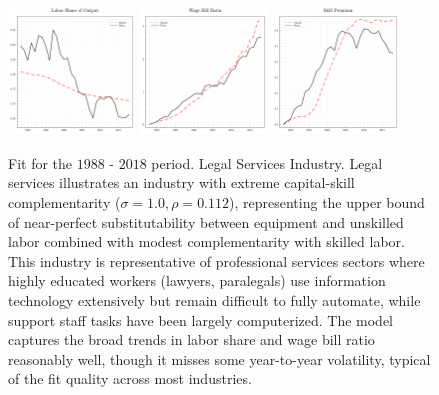 \documentclass[12pt]{article}
\begin{document}
\begin{figure}[H]
 \centering
 \includegraphics[width=0.3\textwidth]{../images/fig_ind_5411_estimation_ls_doc.pdf}
 \hfill
 \includegraphics[width=0.3\textwidth]{../images/fig_ind_5411_estimation_wbr_doc.pdf}
 \hfill
 \includegraphics[width=0.3\textwidth]{../images/fig_ind_5411_estimation_sp_doc.pdf}
 \caption{\label{fig:estimation_5411} Fit for the $1988$ - $2018$ period. Legal Services Industry. Legal services illustrates an industry with extreme capital-skill complementarity ($\sigma = 1.0, \rho = 0.112$), representing the upper bound of near-perfect substitutability between equipment and unskilled labor combined with modest complementarity with skilled labor. This industry is representative of professional services sectors where highly educated workers (lawyers, paralegals) use information technology extensively but remain difficult to fully automate, while support staff tasks have been largely computerized. The model captures the broad trends in labor share and wage bill ratio reasonably well, though it misses some year-to-year volatility, typical of the fit quality across most industries.}
\end{figure}
\end{document}
